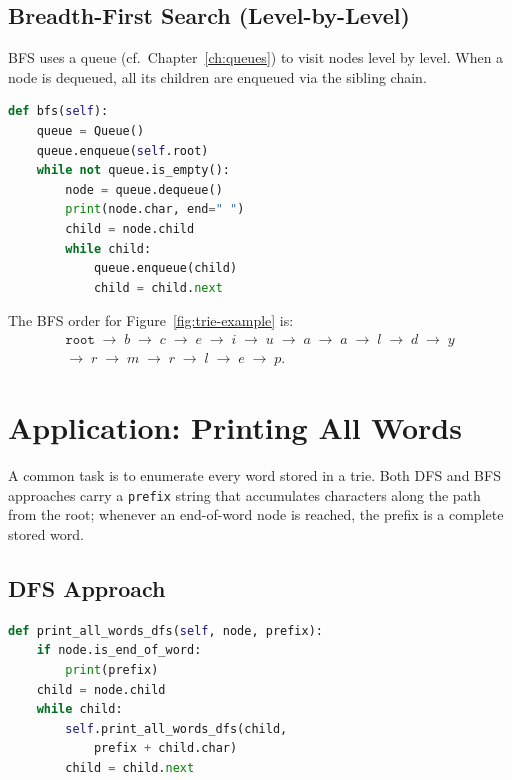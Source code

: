 \documentclass[11pt, a4paper, notitlepage]{report}
\theoremstyle{definition}
\theoremstyle{remark}
\theoremstyle{definition}
\begin{document}
\subsection{Breadth-First Search (Level-by-Level)}
\label{subsec:trie-bfs}

BFS uses a queue (cf.\ Chapter~\ref{ch:queues}) to visit nodes level by level.
When a node is dequeued, all its children are enqueued via the sibling chain.

\begin{lstlisting}[language=Python]
def bfs(self):
    queue = Queue()
    queue.enqueue(self.root)
    while not queue.is_empty():
        node = queue.dequeue()
        print(node.char, end=" ")
        child = node.child
        while child:
            queue.enqueue(child)
            child = child.next
\end{lstlisting}

The BFS order for Figure~\ref{fig:trie-example} is:
\begin{multline*}
  \texttt{root} \;\to\; b \;\to\; c \;\to\; e \;\to\; i \;\to\;
  u \;\to\; a \;\to\; a \;\to\; l \;\to\; d \;\to\; y \\
  \to\; r \;\to\; m \;\to\; r \;\to\; l \;\to\; e \;\to\; p.
\end{multline*}

\section{Application: Printing All Words}
\label{sec:trie-print-all}

A common task is to enumerate every word stored in a trie.  Both DFS and BFS
approaches carry a \texttt{prefix} string that accumulates characters along
the path from the root; whenever an end-of-word node is reached, the prefix
is a complete stored word.

\subsection{DFS Approach}
\label{subsec:trie-print-dfs}

\begin{lstlisting}[language=Python]
def print_all_words_dfs(self, node, prefix):
    if node.is_end_of_word:
        print(prefix)
    child = node.child
    while child:
        self.print_all_words_dfs(child,
            prefix + child.char)
        child = child.next
\end{lstlisting}
\end{document}
